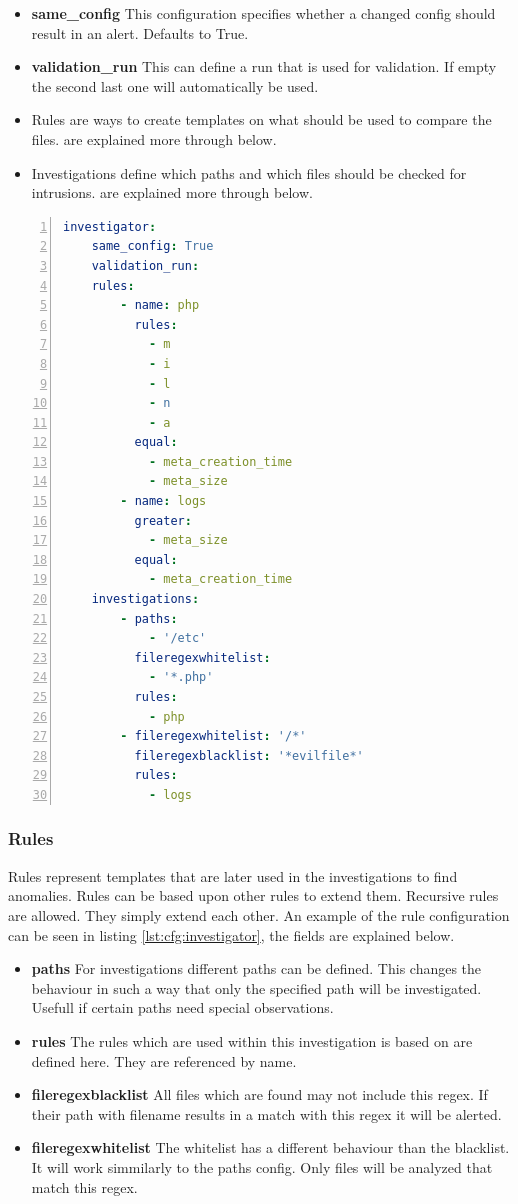 \begin{itemize}
	\item \textbf{same\_config} This configuration specifies whether a changed config should result in an alert. Defaults to True.
	\item \textbf{validation\_run} This can define a run that is used for validation. If empty the second last one will automatically be used.
	\item \textbf{} Rules are ways to create templates on what should be used to compare the files.  are explained more through below.
	\item \textbf{} Investigations define which paths and which files should be checked for intrusions.  are explained more through below.
\end{itemize}

\begin{lstlisting}[language=yaml, numbers=left, caption=Investigator Configuration, label=lst:cfg:investigator]
investigator:
	same_config: True
	validation_run: 
	rules: 
		- name: php
		  rules: 
			- m
			- i
			- l
			- n
			- a
		  equal:
			- meta_creation_time
			- meta_size
		- name: logs
		  greater:
			- meta_size
		  equal:
			- meta_creation_time
	investigations:
		- paths:
			- '/etc'
		  fileregexwhitelist:
			- '*.php'
		  rules:
			- php
		- fileregexwhitelist: '/*'
		  fileregexblacklist: '*evilfile*'
		  rules:
			- logs
\end{lstlisting}

\subsubsection{Rules}
\label{sec:config:rules}

Rules represent templates that are later used in the investigations to find anomalies. Rules can be based upon other rules to extend them. Recursive rules are allowed. They simply extend each other. An example of the rule configuration can be seen in listing \ref{lst:cfg:investigator}, the fields are explained below.

\begin{itemize}
	\item \textbf{paths} For investigations different paths can be defined. This changes the behaviour in such a way that only the specified path will be investigated. Usefull if certain paths need special observations.
	\item \textbf{rules} The rules which are used within this investigation is based on are defined here. They are referenced by name.
	\item \textbf{fileregexblacklist} All files which are found may not include this \gls{regex}. If their path with filename results in a match with this \gls{regex} it will be alerted. 
	\item \textbf{fileregexwhitelist} The whitelist has a different behaviour than the blacklist. It will work simmilarly to the paths config. Only files will be analyzed that match this \gls{regex}.
\end{itemize}


